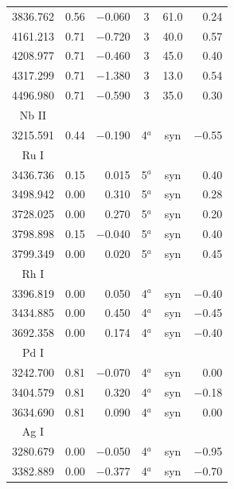 \documentclass{aa}
\begin{document}
\begin{table}[h]
\begin{tabular}{ccrccr}
\hline
3836.762 & 0.56 & $-$0.060 & 3 &  61.0 &    0.24\\
4161.213 & 0.71 & $-$0.720 & 3 &  40.0 &    0.57\\
4208.977 & 0.71 & $-$0.460 & 3 &  45.0 &    0.40\\
4317.299 & 0.71 & $-$1.380 & 3 &  13.0 &    0.54\\
4496.980 & 0.71 & $-$0.590 & 3 &  35.0 &    0.30\\
\hline
Nb II\\
\hline
3215.591 & 0.44 & $-$0.190 & 4$^{a}$ &  syn  & $-$0.55\\
\hline
Ru I\\
\hline
3436.736 & 0.15 &    0.015 & 5$^{a}$ &  syn  &    0.40\\
3498.942 & 0.00 &    0.310 & 5$^{a}$ &  syn  &    0.28\\
3728.025 & 0.00 &    0.270 & 5$^{a}$ &  syn  &    0.20\\
3798.898 & 0.15 & $-$0.040 & 5$^{a}$ &  syn  &    0.40\\
3799.349 & 0.00 &    0.020 & 5$^{a}$ &  syn  &    0.45\\
\hline
Rh I\\
\hline
3396.819 & 0.00 &    0.050 & 4$^{a}$ &  syn  & $-$0.40\\
3434.885 & 0.00 &    0.450 & 4$^{a}$ &  syn  & $-$0.45\\
3692.358 & 0.00 &    0.174 & 4$^{a}$ &  syn  & $-$0.40\\
\hline
Pd I\\
\hline
3242.700 & 0.81 & $-$0.070 & 4$^{a}$ &  syn  &    0.00\\
3404.579 & 0.81 &    0.320 & 4$^{a}$&  syn  & $-$0.18\\
3634.690 & 0.81 &    0.090 & 4$^{a}$&  syn  &    0.00\\
\hline
Ag I\\
\hline
3280.679 & 0.00 & $-$0.050 & 4$^{a}$&  syn  & $-$0.95\\
3382.889 & 0.00 & $-$0.377 & 4$^{a}$&  syn  & $-$0.70\\
\end{tabular}
\end{table}
\end{document}
